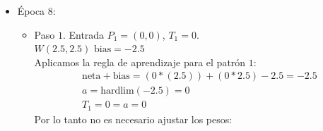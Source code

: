 \documentclass{article}
\begin{document}
{{\begin{itemize}
\begin{itemize}
Aplicamos la regla de aprendizaje para el patrón $3$:
\begin{align*}
&\text{neta} + \text{bias}= (1 * (2.5)) + (0 * 1.5) - 2.5 = 0\\
&a = \text{hardlim}(0) = 1 \\
&T_3 = 0 \neq a = 1
\end{align*}
Por lo tanto es necesario ajustar los pesos:
\begin{align*}
&e = T_3 - a = 0- 1 =  -1, \\
&W_n = W + e* P_3 = (2.5, 1.5) + (-1) * (1,0) = (1.5, 1.5) \\
&\text{bias}_N = \text{bias} + e = -2.5 - 1 = -3.5
\end{align*}

\item Paso $4$. Entrada $P_4 = (1, 1)$, $T_4 = 1$. \\
$W(1.5, 1.5)$  $\text{bias} = -3.5$ \\

Aplicamos la regla de aprendizaje para el patrón $4$:
\begin{align*}
&\text{neta} + \text{bias}= (1 * (1.5)) + (1 * 1.5) - 3.5 = -0.5\\
&a = \text{hardlim}(-0.5) = 0 \\
&T_4 = 1 \neq a = 0
\end{align*}
Por lo tanto es necesario ajustar los pesos:
\begin{align*}
&e = T_4 - a = 1- 0 =  1, \\
&W_n = W + e* P_4 = (1.5, 1.5) + (1) * (1,1) = (2.5, 2.5) \\
&\text{bias}_N = \text{bias} + e = -3.5 + 1 = -2.5
\end{align*}
\end{itemize}

\item Época 8:
\begin{itemize}
\item Paso $1$. Entrada $P_1 = (0, 0)$, $T_1 = 0$. \\
$W(2.5, 2.5)$  $\text{bias} = -2.5$ \\

Aplicamos la regla de aprendizaje para el patrón $1$:
\begin{align*}
&\text{neta} + \text{bias}= (0 * (2.5)) + (0 * 2.5) - 2.5 = -2.5\\
&a = \text{hardlim}(-2.5) = 0 \\
&T_1 = 0 = a = 0
\end{align*}
Por lo tanto no es necesario ajustar los pesos:


\end{itemize}
\end{itemize}}}
\end{document}
